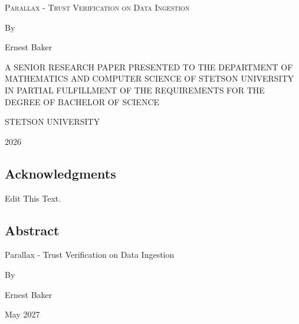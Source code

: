 \documentclass[12pt]{article}
\newcommand{\myTitle}{Parallax - Trust Verification on Data Ingestion}
\newcommand{\myAuthor}{Ernest Baker}
\newcommand{\myPublicationYear}{2026}
\newcommand{\myGraduationDate}{May 2027}
\newcommand{\bigName}[1]{
   \begin{center}\fontfamily{phv}\selectfont\Huge\scshape#1\end{center}
}
\begin{document}
\bigName{\myTitle}

\vspace{2.25in}
\begin{centering}
By

\myAuthor

\vspace{2.25in}
\singlespacing
A SENIOR RESEARCH PAPER PRESENTED TO THE DEPARTMENT OF MATHEMATICS AND COMPUTER
SCIENCE OF STETSON UNIVERSITY IN PARTIAL FULFILLMENT OF THE REQUIREMENTS FOR THE
DEGREE OF BACHELOR OF SCIENCE
\singlespacing

\vspace{.5in}

STETSON UNIVERSITY

\myPublicationYear
\newpage

\setcounter{section}{0}
\subsection*{Acknowledgments}


\doublespacing
Edit This Text.
\doublespacing
\newpage
\tableofcontents

\newpage
\listoftables
%
\listoffigures

\newpage
\subsection*{Abstract}

\singlespacing
\myTitle

By

\myAuthor

\myGraduationDate

\end{centering}
\end{document}
